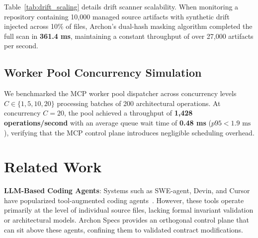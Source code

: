 \begin{table}[t]
  \centering
  \caption{\textbf{Drift Detection Scaling.} Linear $\mathcal{O}(N)$ scanning performance across managed files on disk.}
  \label{tab:drift_scaling}
\end{table}

Table~\ref{tab:drift_scaling} details drift scanner scalability. When monitoring a repository containing 10,000 managed source artifacts with synthetic drift injected across 10\% of files, Archon's dual-hash masking algorithm completed the full scan in \textbf{361.4 ms}, maintaining a constant throughput of over 27,000 artifacts per second.

\subsection{Worker Pool Concurrency Simulation}
We benchmarked the MCP worker pool dispatcher across concurrency levels $C \in \{1, 5, 10, 20\}$ processing batches of 200 architectural operations. At concurrency $C=20$, the pool achieved a throughput of \textbf{1,428 operations/second} with an average queue wait time of \textbf{0.48 ms} ($p95 < 1.9\text{ ms}$), verifying that the MCP control plane introduces negligible scheduling overhead.

\section{Related Work}
\label{sec:related}

\textbf{LLM-Based Coding Agents}: Systems such as SWE-agent, Devin, and Cursor have popularized tool-augmented coding agents~\cite{jimenez2024swebench,hou2024large}. However, these tools operate primarily at the level of individual source files, lacking formal invariant validation or architectural models. Archon Specs provides an orthogonal control plane that can sit above these agents, confining them to validated contract modifications.

